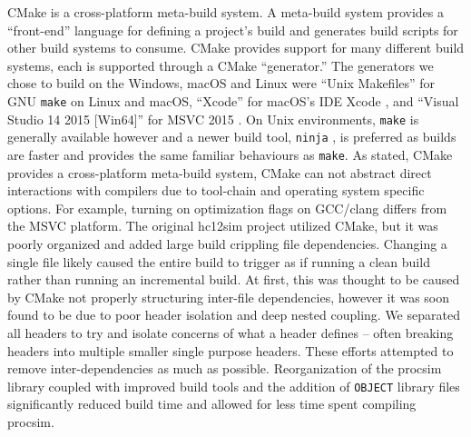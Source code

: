 CMake \cite{Kitware:CMake} is a cross-platform meta-build system. A meta-build system provides a ``front-end'' language for defining a project's build and generates build scripts for other build systems to consume. CMake provides support for many different build systems, each is supported through a CMake ``generator.'' The generators we chose to build on the Windows, macOS and Linux were ``Unix Makefiles'' for GNU \texttt{make} \cite{GNU:Make} on Linux and macOS, ``Xcode'' for macOS's IDE Xcode \cite{Apple:Xcode}, and ``Visual Studio 14 2015 [Win64]'' for MSVC 2015 \cite{CMake:Generators}. On Unix environments, \texttt{make} is generally available however and a newer build tool, \texttt{ninja} \cite{NinjaBuild}, is preferred as builds are faster and provides the same familiar behaviours as \texttt{make}. As stated, CMake provides a cross-platform meta-build system, CMake can not abstract direct interactions with compilers due to tool-chain and operating system specific options. For example, turning on optimization flags on GCC/clang differs from the MSVC platform. The original hc12sim project utilized CMake, but it was poorly organized and added large build crippling file dependencies. Changing a single file likely caused the entire build to trigger as if running a clean build rather than running an incremental build. At first, this was thought to be caused by CMake not properly structuring inter-file dependencies, however it was soon found to be due to poor header isolation and deep nested coupling. We separated all headers to try and isolate concerns of what a header defines -- often breaking headers into multiple smaller single purpose headers. These efforts attempted to remove inter-dependencies as much as possible. Reorganization of the procsim library coupled with improved build tools and the addition of \texttt{OBJECT} library files \cite{CMake:add_library} significantly reduced build time and allowed for less time spent compiling procsim. 

